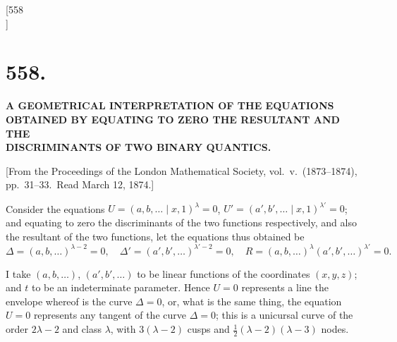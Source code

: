 \documentclass[11pt,a4paper]{book}
\begin{document}

\newpage
\setcounter{page}{16}

\begin{center}
[558\\
]
\end{center}

\section*{\textbf{558.}}

\begin{center}
{\large \textbf{A GEOMETRICAL INTERPRETATION OF THE EQUATIONS}}\\[4pt]
{\large \textbf{OBTAINED BY EQUATING TO ZERO THE RESULTANT AND THE}}\\[4pt]
{\large \textbf{DISCRIMINANTS OF TWO BINARY QUANTICS.}}
\end{center}

\begin{flushright}
{\small [From the Proceedings of the London Mathematical Society, vol.\ v.\ (1873--1874), pp.\ 31--33.\ Read March 12, 1874.]}
\end{flushright}

Consider the equations $U = (a, b, \ldots \mid x, 1)^\lambda = 0$, $U' = (a', b', \ldots \mid x, 1)^{\lambda'} = 0$; and equating to zero the discriminants of the two functions respectively, and also the resultant of the two functions, let the equations thus obtained be
\[
\Delta = (a, b, \ldots)^{\lambda-2} = 0,\quad \Delta' = (a', b', \ldots)^{\lambda'-2} = 0,\quad R = (a, b, \ldots)^\lambda (a', b', \ldots)^{\lambda'} = 0.
\]

I take $(a, b, \ldots)$, $(a', b', \ldots)$ to be linear functions of the coordinates $(x, y, z)$; and $t$ to be an indeterminate parameter. Hence $U = 0$ represents a line the envelope whereof is the curve $\Delta = 0$, or, what is the same thing, the equation $U = 0$ represents any tangent of the curve $\Delta = 0$; this is a unicursal curve of the order $2\lambda - 2$ and class $\lambda$, with $3(\lambda - 2)$ cusps and $\tfrac{1}{2}(\lambda - 2)(\lambda - 3)$ nodes.
\end{document}
